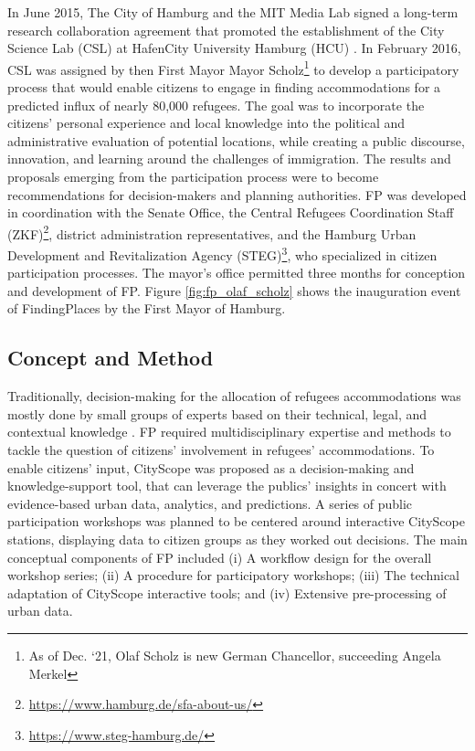 {{        In June 2015, The City of Hamburg and the MIT Media Lab signed a long-term research collaboration agreement that promoted the establishment of the City Science Lab (CSL) at HafenCity University Hamburg (HCU) \cite{HafenCit25:online}. In February 2016, CSL was assigned by then First Mayor Mayor Scholz\footnote{As of Dec. `21, Olaf Scholz is new German Chancellor, succeeding Angela Merkel} to develop a participatory process that would enable citizens to engage in finding accommodations for a predicted influx of nearly 80,000 refugees. The goal was to incorporate the citizens' personal experience and local knowledge into the political and administrative evaluation of potential locations, while creating a public discourse, innovation, and learning around the challenges of immigration. The results and proposals emerging from the participation process were to become recommendations for decision-makers and planning authorities. FP was developed in coordination with the Senate Office, the Central Refugees Coordination Staff (ZKF)\footnote{\url{https://www.hamburg.de/sfa-about-us/}}, district administration representatives, and the Hamburg Urban Development and Revitalization Agency (STEG)\footnote{\url{https://www.steg-hamburg.de/}}, who specialized in citizen participation processes. The mayor's office permitted three months for conception and development of FP. Figure \ref{fig:fp_olaf_scholz} shows the inauguration event of FindingPlaces by the First Mayor of Hamburg.
    }

    \subsection{Concept and Method}
    {
        Traditionally, decision-making for the allocation of refugees accommodations was mostly done by small groups of experts based on their technical, legal, and contextual knowledge \cite{sprandel2018housing}. FP required multidisciplinary expertise and methods to tackle the question of citizens' involvement in refugees' accommodations. To enable citizens' input, CityScope was proposed as a decision-making and knowledge-support tool, that can leverage the publics' insights in concert with evidence-based urban data, analytics, and predictions. A series of public participation workshops was planned to be centered around interactive CityScope stations, displaying data to citizen groups as they worked out decisions. The main conceptual components of FP included (i) A workflow design for the overall workshop series; (ii) A procedure for participatory workshops; (iii) The technical adaptation of CityScope interactive tools; and (iv) Extensive pre-processing of urban data.
    }

}

